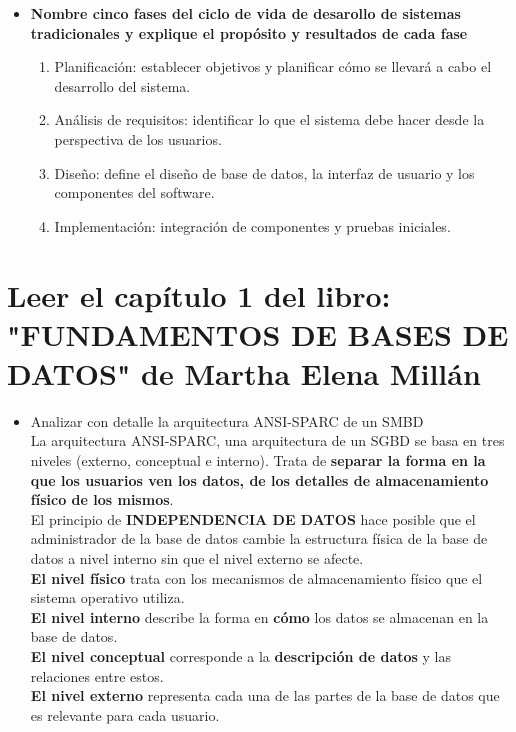 \documentclass[letterpaper,12pt]{article}
\begin{document}
\begin{sloppypar}
\begin{itemize}
    \item \textbf{Nombre cinco fases del ciclo de vida de desarollo de sistemas tradicionales y explique el propósito y resultados de cada fase}
    \begin{enumerate}
        \item Planificación: establecer objetivos y planificar cómo se llevará a cabo el desarrollo del sistema. 
        \item Análisis de requisitos: identificar lo que el sistema debe hacer desde la perspectiva de los usuarios.
        \item Diseño: define el diseño de base de datos, la interfaz de usuario y los componentes del software.
        \item Implementación: integración de componentes y pruebas iniciales.
    \end{enumerate}
\newpage
\end{itemize}
\section*{Leer el capítulo 1 del libro: "FUNDAMENTOS DE BASES DE DATOS" de Martha Elena Millán}
\begin{itemize}
    \item Analizar con detalle la arquitectura ANSI-SPARC de un SMBD
    \vspace{0.3cm}\\
    La arquitectura ANSI-SPARC, una arquitectura de un SGBD se basa en tres niveles (externo, conceptual e interno). Trata de \textbf{separar la forma en la que los usuarios ven los datos, de los detalles de almacenamiento físico de los mismos}. \\ El principio de \textbf{INDEPENDENCIA DE DATOS} hace posible que el administrador de la base de datos cambie la estructura física de la base de datos a nivel interno sin que el nivel externo se afecte.
        \vspace{0.3cm}\\ 
        \textbf{El nivel físico} trata con los mecanismos de almacenamiento físico que el sistema operativo utiliza.
        \vspace{0.3cm}\\ 
        \textbf{El nivel interno} describe la forma en \textbf{cómo} los datos se almacenan en la base de datos.
        \vspace{0.3cm}\\ 
        \textbf{El nivel conceptual} corresponde a la \textbf{descripción de datos} y las relaciones entre estos.
        \vspace{0.3cm}\\ 
        \textbf{El nivel externo} representa cada una de las partes de la base de datos que es relevante para cada usuario.
        \vspace{0.3cm}\\ 
        \begin{center}
            

\end{center}
\end{itemize}
\end{sloppypar}
\end{document}
